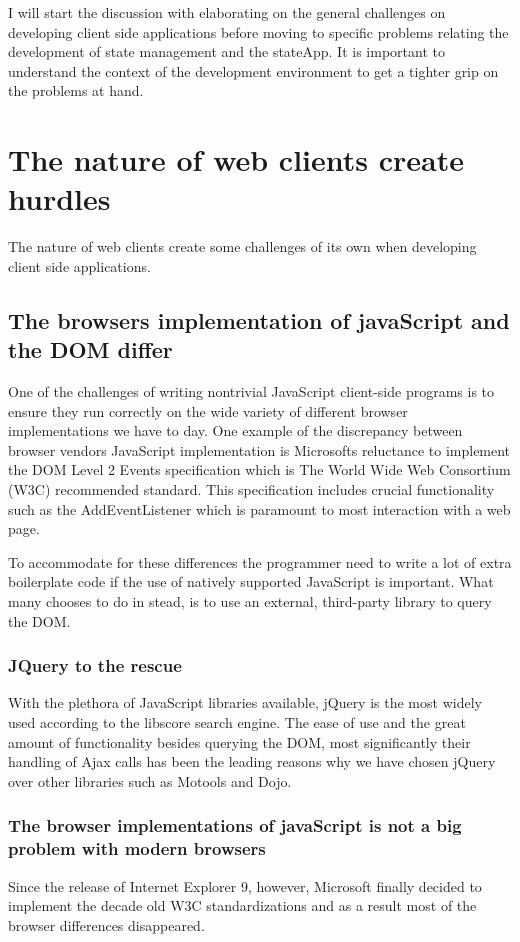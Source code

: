 \documentclass[english]{ifimaster}
\begin{document}
I will start the discussion with elaborating on the general challenges on developing client side applications before moving to specific problems relating the development of state management and the stateApp. It is important to understand the context of the development environment to get a tighter grip on the problems at hand.
\section{The nature of web clients create hurdles}
The nature of web clients create some challenges of its own when developing client side applications. 

\subsection{The browsers implementation of javaScript and the DOM differ}
One of the challenges of writing nontrivial JavaScript client-side programs is to ensure they run correctly on the wide variety of different browser implementations we have to day\parencite[p. 325]{flanagan}. One example of the discrepancy between browser vendors JavaScript implementation is Microsofts reluctance to implement the DOM Level 2 Events specification which is The World Wide Web Consortium (W3C) recommended standard\parencite{w3c}. This specification includes crucial functionality such as the AddEventListener which is paramount to most interaction with a web page. 

To accommodate for these differences the programmer need to write a lot of extra boilerplate code if the use of natively supported JavaScript is important. What many chooses to do in stead, is to use an external, third-party library to query the DOM. 

\subsubsection{JQuery to the rescue}
With the plethora of JavaScript libraries available, jQuery is the most widely used according to the libscore search engine\parencite{infoWorld}. The ease of use and the great amount of functionality besides querying the DOM, most significantly their handling of Ajax calls has been the leading reasons why we have chosen jQuery over other libraries such as Motools and Dojo. 

\subsubsection{The browser implementations of javaScript is not a big problem with modern browsers}
Since the release of Internet Explorer 9, however, Microsoft finally decided to implement the decade old W3C standardizations and as a result most of the browser differences disappeared. 
\end{document}
